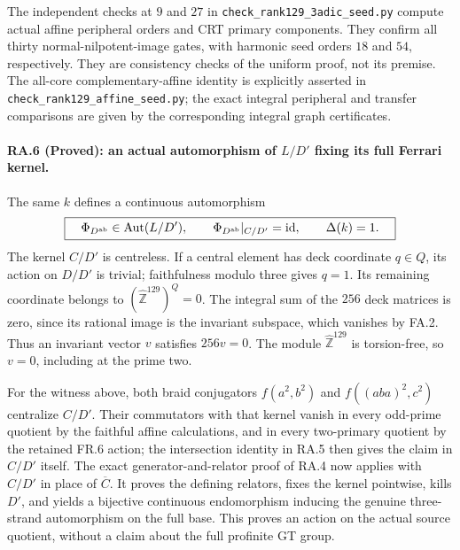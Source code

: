 The independent checks at $9$ and $27$ in
\texttt{check\_rank129\_3adic\_seed.py} compute actual
affine peripheral orders and CRT primary components.
They confirm all thirty normal-nilpotent-image gates,
with harmonic seed orders $18$ and $54$, respectively.
They are consistency checks of the uniform proof,
not its premise.  The all-core complementary-affine
identity is explicitly asserted in
\texttt{check\_rank129\_affine\_seed.py}; the exact
integral peripheral and transfer comparisons are
given by the corresponding integral graph certificates.

\paragraph{RA.6 (Proved): an actual automorphism of
$L/D'$ fixing its full Ferrari kernel.}
The same $k$ defines a continuous automorphism
\[
 \boxed{\quad
 \Phi_{D^{\rm ab}}\in\operatorname{Aut}(L/D'),
 \qquad
 \Phi_{D^{\rm ab}}|_{C/D'}=\operatorname{id},
 \qquad\Delta(k)=1.\quad}
\]
The kernel $C/D'$ is centreless.  If a central element
has deck coordinate $q\in Q$, its action on
$D/D'$ is trivial; faithfulness modulo three gives
$q=1$.  Its remaining coordinate belongs to
$(\widehat{\mathbb Z}^{129})^Q=0$.  The integral sum of the $256$ deck matrices is zero,
since its rational image is the invariant subspace,
which vanishes by FA.2. Thus an invariant vector $v$
satisfies $256v=0$. The module $\widehat{\mathbb Z}^{129}$
is torsion-free, so $v=0$, including at the prime two.

For the witness above, both braid conjugators
$f(a^2,b^2)$ and $f((aba)^2,c^2)$ centralize
$C/D'$.  Their commutators with that kernel vanish
in every odd-prime quotient by the faithful affine
calculations, and in every two-primary quotient by
the retained FR.6 action; the intersection identity
in RA.5 then gives the claim in $C/D'$ itself.
The exact generator-and-relator proof of RA.4 now
applies with $C/D'$ in place of $\overline C$.
It proves the defining relators, fixes the kernel
pointwise, kills $D'$, and yields a bijective
continuous endomorphism inducing the genuine
three-strand automorphism on the full base.
This proves an action on the actual source quotient,
without a claim about the full profinite GT group.
